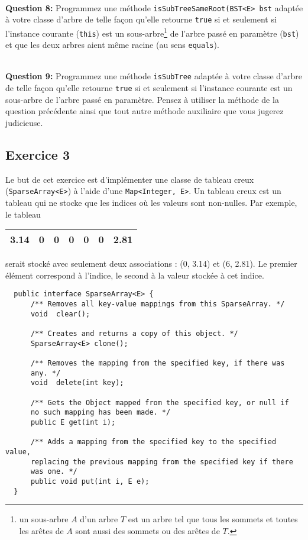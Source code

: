 \documentclass[iutinfo,10pt]{ustl-tdtp}
\begin{document}
~\\ \textbf{Question 8:} Programmez une méthode \texttt{isSubTreeSameRoot(BST<E> bst} adaptée à votre classe d'arbre de telle façon qu'elle retourne \texttt{true} si et seulement si l'instance courante (\texttt{this}) est un sous-arbre\footnote{un sous-arbre ${\displaystyle A}$ d'un arbre ${\displaystyle T}$ est un arbre tel que tous les sommets et toutes les arêtes de ${\displaystyle A}$ sont aussi des sommets ou des arêtes de ${\displaystyle T}$.} de l'arbre passé en paramètre (\texttt{bst}) et que les deux arbres aient même racine (au sens \texttt{equals}).

~\\ \textbf{Question 9:} Programmez une méthode \texttt{isSubTree} adaptée à votre classe d'arbre de telle façon qu'elle retourne \texttt{true} si et seulement si l'instance courante est un sous-arbre de l'arbre passé en paramètre. Pensez à utiliser la méthode de la question précédente ainsi que tout autre méthode auxiliaire que vous jugerez judicieuse.

\vspace{2cm}
\subsection*{Exercice 3}

Le but de cet exercice est d'implémenter une classe de tableau creux (\texttt{SparseArray<E>}) à l'aide d'une \texttt{Map<Integer, E>}. Un tableau creux est un tableau qui ne stocke que les indices où les valeurs sont non-nulles. Par exemple, le tableau 
\begin{tabular}{|c|c|c|c|c|c|c|}
\hline
3.14&0&0&0&0&0&2.81  \\
\hline
\end{tabular}
serait stocké avec seulement deux associations : (0, 3.14) et (6, 2.81). Le premier élément correspond à l'indice, le second à la valeur stockée à cet indice.

\begin{verbatim}
  public interface SparseArray<E> {
      /** Removes all key-value mappings from this SparseArray. */
      void 	clear();
      
      /** Creates and returns a copy of this object. */
      SparseArray<E> clone();
      
      /** Removes the mapping from the specified key, if there was
      any. */
      void 	delete(int key);
      
      /** Gets the Object mapped from the specified key, or null if 
      no such mapping has been made. */
      public E get(int i);
      
      /** Adds a mapping from the specified key to the specified value,
      replacing the previous mapping from the specified key if there 
      was one. */
      public void put(int i, E e);
  }
\end{verbatim}
\end{document}
